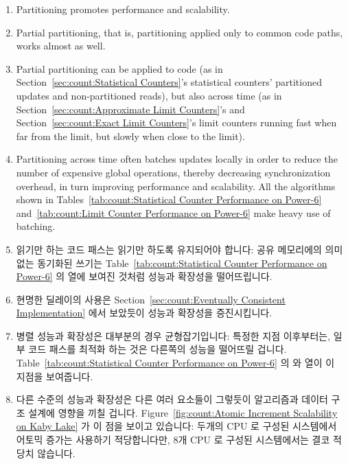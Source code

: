\begin{lineref}
\begin{enumerate}
\begin{enumerate}
\item	Partitioning promotes performance and scalability.
\item	Partial partitioning, that is, partitioning applied only to
	common code paths, works almost as well.
\item	Partial partitioning can be applied to code (as in
	Section~\ref{sec:count:Statistical Counters}'s statistical
	counters' partitioned updates and non-partitioned reads), but also
	across time (as in
	Section~\ref{sec:count:Approximate Limit Counters}'s and
	Section~\ref{sec:count:Exact Limit Counters}'s
	limit counters running fast when far from
	the limit, but slowly when close to the limit).
\item	Partitioning across time often batches updates locally
	in order to reduce the number of expensive global operations,
	thereby decreasing synchronization overhead, in turn
	improving performance and scalability.
	All the algorithms shown in
	Tables~\ref{tab:count:Statistical Counter Performance on Power-6}
	and~\ref{tab:count:Limit Counter Performance on Power-6}
	make heavy use of batching.
\fi
\item	읽기만 하는 코드 패스는 읽기만 하도록 유지되어야 합니다:  공유
	메모리에의 의미없는 동기화된 쓰기는
	Table~\ref{tab:count:Statistical Counter Performance on Power-6} 의
	 열에 보여진 것처럼 성능과 확장성을 떨어뜨립니다.
\item	현명한 딜레이의 사용은
	Section~\ref{sec:count:Eventually Consistent Implementation} 에서
	보았듯이 성능과 확장성을 증진시킵니다.
\item	병렬 성능과 확장성은 대부분의 경우 균형잡기입니다: 특정한 지점
	이후부터는, 일부 코드 패스를 최적화 하는 것은 다른쪽의 성능을 떨어뜨릴
	겁니다.
	Table~\ref{tab:count:Statistical Counter Performance on Power-6} 의
	 와  열이 이 지점을
	보여줍니다.
\item	다른 수준의 성능과 확장성은 다른 여러 요소들이 그렇듯이 알고리즘과
	데이터 구조 설계에 영향을 끼칠 겁니다.
	Figure~\ref{fig:count:Atomic Increment Scalability on Kaby Lake} 가 이
	점을 보이고 있습니다:  두개의 CPU 로 구성된 시스템에서 어토믹 증가는
	사용하기 적당합니다만, 8개 CPU 로 구성된 시스템에서는 결코 적당치
	않습니다.
\iffalse


\end{enumerate}
\end{enumerate}
\end{lineref}
